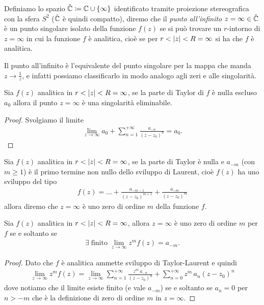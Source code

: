 \begin{definition}
  Definiamo lo spazio $ \hat{\mathbb{C}} \coloneq \mathbb{C} \cup \{\infty\} $ identificato tramite proiezione stereografica con la sfera $ S^2 $ 
  ($ \hat{\mathbb{C}} $ è quindi compatto), diremo che il \textit{punto all'infinito} $ z = \infty \in \hat{\mathbb{C}} $ è un punto singolare isolato 
  della funzione $ f(z) $ se si può trovare un $ r $-intorno di $ z = \infty $ in cui la funzione $ f $ è analitica, cioè se per 
  $ r < \left|{z}\right| < R = \infty $ si ha che $ f $ è analitica.
\end{definition}

Il punto all'infinito è l'equivalente del punto singolare per la mappa che manda $ z \to \frac1z $, e infatti possiamo classificarlo in modo analogo 
agli zeri e alle singolarità.

\begin{theorem}[  ]
  Sia $ f(z) $ analitica in $ r < \left|{z}\right| < R = \infty $, se la parte di Taylor di $ f $ è nulla escluso $ a_0 $ allora il punto $ z = \infty $ è 
  una singolarità eliminabile.
\end{theorem}
\begin{proof}
  Svolgiamo il limite 
  \begin{align}
   \lim_{z \to \infty} a_0 + \sum_{n = 1}^{+\infty} \frac{a_{-n}}{(z-z_0)^n} = a_0.
  \end{align}
\end{proof}

\begin{definition}[  ]
  Sia $ f(z) $ analitica in $ r < \left|{z}\right| < R = \infty $, se la parte di Taylor è nulla e $ a_{-m} $ (con $ m \geq 1 $) è il primo termine non nullo 
  dello sviluppo di Laurent, cioè $ f(z) $ ha uno sviluppo del tipo 
  \begin{align}
    f(z) = \dots + \frac{a_{-m-1}}{(z-z_0)^{m+1}} + \frac{a_{-m}}{(z-z_0)^{m}}
  \end{align}
  allora diremo che $ z = \infty $ è uno zero di ordine $ m $ della funzione $ f $.
\end{definition}

\begin{theorem}[  ]
  Sia $ f(z) $ analitica in $ r < \left|{z}\right| < R = \infty $, allora $ z = \infty $ è uno zero di ordine $ m $ per $ f $ se e soltanto se 
  \begin{align}
    \exists\; \text{finito}\; \lim_{z \to \infty} z^m f(z) = a_{-m}.
  \end{align}
\end{theorem}
\begin{proof}
  Dato che $ f $ è analitica ammette sviluppo di Taylor-Laurent e quindi 
  \begin{align}
    \lim_{z\to \infty} z^m f(z) 
    = \lim_{z \to \infty} \sum_{n = 1}^{+\infty} \frac{z^m \, a_{-n}}{(z - z_0)^n} + \sum_{n = 0}^{+\infty} z^m \, a_n ( z- z_0)^n
  \end{align}
  dove notiamo che il limite esiste finito (e vale $ a_{-m} $) se e soltanto se $ a_n = 0 $ per $ n > -m $ che è la definizione di zero di 
  ordine $ m $ in $ z = \infty $.
\end{proof}

